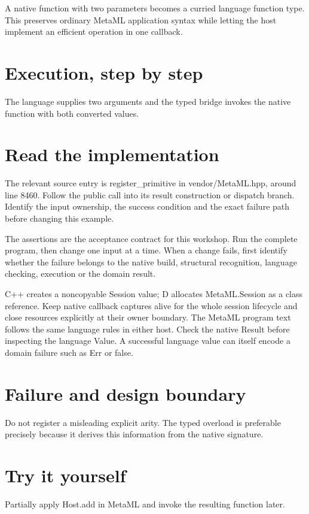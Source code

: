 \clearpage
{}
A native function with two parameters becomes a curried language function type. This preserves ordinary MetaML application syntax while letting the host implement an efficient operation in one callback.


\section*{Execution, step by step}
The language supplies two arguments and the typed bridge invokes the native function with both converted values.

\section*{Read the implementation}
The relevant source entry is register\_primitive in vendor/MetaML.hpp, around line 8460. Follow the public call into its result construction or dispatch branch. Identify the input ownership, the success condition and the exact failure path before changing this example.

The assertions are the acceptance contract for this workshop. Run the complete program, then change one input at a time. When a change fails, first identify whether the failure belongs to the native build, structural recognition, language checking, execution or the domain result.

\clearpage
{}
C++ creates a noncopyable Session value; D allocates MetaML.Session as a class reference. Keep native callback captures alive for the whole session lifecycle and close resources explicitly at their owner boundary. The MetaML program text follows the same language rules in either host. Check the native Result before inspecting the language Value. A successful language value can itself encode a domain failure such as Err or false.


\section*{Failure and design boundary}
Do not register a misleading explicit arity. The typed overload is preferable precisely because it derives this information from the native signature.

\section*{Try it yourself}
Partially apply Host.add in MetaML and invoke the resulting function later.

